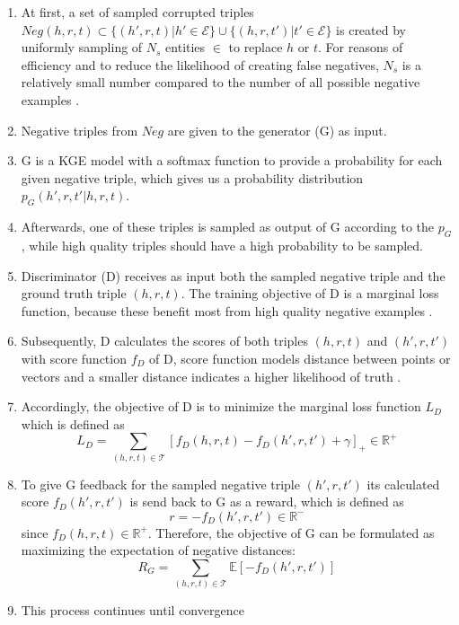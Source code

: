 \begin{enumerate}
    \item 
    At first, a set of sampled corrupted triples $Neg(h,r,t)\subset\{(h',r,t)|h'\in\mathcal{E}\}\cup\{(h,r,t')|t'\in\mathcal{E}\}$ is created by uniformly sampling of $N_s$ entities $\in$ \entities to replace $h$ or $t$.
    For reasons of efficiency and to reduce the likelihood of creating false negatives, $N_s$ is a relatively small number compared to the number of all possible negative examples \cite{cai2017kbgan}.
    
    \item 
    Negative triples from $Neg$ are given to the generator (G) as input.
    
    \item 
    G is a \ac{KGE} model with a softmax function to provide a probability for each given negative triple, which gives us a probability distribution $p_G(h',r,t'|h,r,t)$.

    \item 
    Afterwards, one of these triples is sampled as output of G according to the $p_G$, while high quality triples should have a high probability to be sampled.
    
    \item 
    Discriminator (D) receives as input both the sampled negative triple and the ground truth triple $(h,r,t)$.
    The training objective of D is a marginal loss function, because these benefit most from high quality negative examples \cite{cai2017kbgan}.

    \item 
    Subsequently, D calculates the scores of both triples $(h,r,t)$ and $(h',r,t')$ with score function $f_D$ of D, score function models distance between points or vectors and a smaller distance indicates a higher likelihood of truth \cite{cai2017kbgan}.
    
    \item 
    Accordingly, the objective of D is to minimize the marginal loss function $L_D$ which is defined as
    \begin{equation}
        L_D=\sum_{(h,r,t)\in\mathcal{T}}[f_D(h,r,t)-f_D(h',r,t')+\gamma]_+ \in \mathbb{R}^+
    \end{equation}
    
    \item 
    To give G feedback for the sampled negative triple $(h',r,t')$ its calculated score $f_D(h',r,t')$ is send back to G as a reward, which is defined as
    \begin{equation}
        r = -f_D(h',r,t') \in \mathbb{R}^-
    \end{equation}
    since $f_D(h,r,t) \in \mathbb{R}^+$.
    Therefore, the objective of G can be formulated as maximizing the expectation of negative distances:
    \begin{equation}
        R_G=\sum_{(h,r,t)\in\mathcal{T}}\mathbb{E}[-f_D(h',r,t')]
    \end{equation}
    
    \item
    This process continues until convergence
\end{enumerate}
